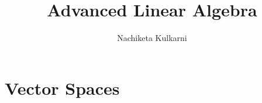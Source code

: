\documentclass{book}
\title{Advanced Linear Algebra}
\author{Nachiketa Kulkarni}
\begin{document}
\maketitle

\mainmatter
\chapter{Vector Spaces}
\end{document}
